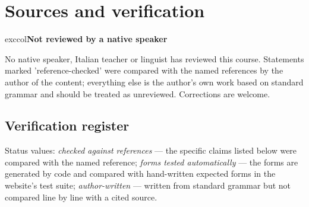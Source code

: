 \documentclass[11pt,a4paper,twoside,openright]{book}
\newcommand{\notelabel}[3]{{\sffamily\small\bfseries\color{#1}#2}\if\relax\detokenize{#3}\relax\else{\sffamily\small\bfseries\ ---\ #3}\fi\par\nopagebreak}
\begin{document}
\chapter{Sources and verification}\label{sources}
\begin{notebox}{exccol}\notelabel{exccol}{Not reviewed by a native speaker}{}No native speaker, Italian teacher or linguist has reviewed this course. Statements marked 'reference-checked' were compared with the named references by the author of the content; everything else is the author's own work based on standard grammar and should be treated as unreviewed. Corrections are welcome.\end{notebox}
\section{Verification register}
Status values: \emph{checked against references} --- the specific claims listed below were compared with the named reference; \emph{forms tested automatically} --- the forms are generated by code and compared with hand-written expected forms in the website's test suite; \emph{author-written} --- written from standard grammar but not compared line by line with a cited source.\par
\end{document}
